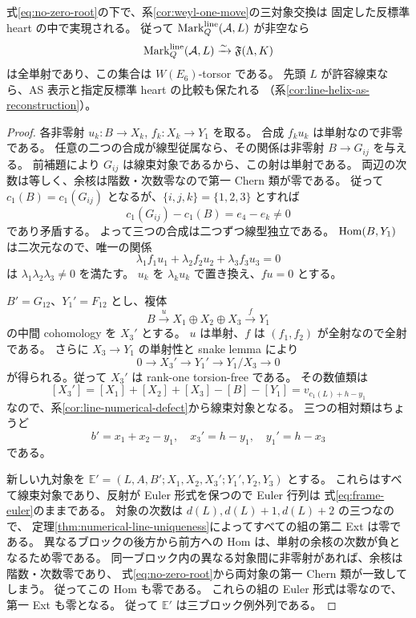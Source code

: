 \begin{theorem}[三対象反射の実現]\label{thm:rootfree-cross-reflection}
式\eqref{eq:no-zero-root}の下で、系\ref{cor:weyl-one-move}の三対象交換は
固定した反標準 heart の中で実現される。
従って $\operatorname{Mark}^{\rm line}_Q(\mathcal A,L)$ が非空なら
\[
 \operatorname{Mark}^{\rm line}_Q(\mathcal A,L)
 \xrightarrow{\sim}\mathfrak F(\Lambda,K)
\]
は全単射であり、この集合は $W(E_6)$-torsor である。
先頭 $L$ が許容線束なら、AS 表示と指定反標準 heart の比較も保たれる
（系\ref{cor:line-helix-as-reconstruction}）。
\end{theorem}
\begin{proof}
各非零射 $u_k:B\to X_k$, $f_k:X_k\to Y_1$ を取る。
合成 $f_ku_k$ は単射なので非零である。
任意の二つの合成が線型従属なら、その関係は非零射
$B\to G_{ij}$ を与える。
前補題により $G_{ij}$ は線束対象であるから、この射は単射である。
両辺の次数は等しく、余核は階数・次数零なので第一 Chern 類が零である。
従って $c_1(B)=c_1(G_{ij})$ となるが、$\{i,j,k\}=\{1,2,3\}$ とすれば
\[
 c_1(G_{ij})-c_1(B)=e_4-e_k\ne0
\]
であり矛盾する。
よって三つの合成は二つずつ線型独立である。
$\operatorname{Hom}(B,Y_1)$ は二次元なので、唯一の関係
\[
 \lambda_1f_1u_1+\lambda_2f_2u_2+\lambda_3f_3u_3=0
\]
は $\lambda_1\lambda_2\lambda_3\ne0$ を満たす。
$u_k$ を $\lambda_ku_k$ で置き換え、$fu=0$ とする。

$B'=G_{12}$、$Y_1'=F_{12}$ とし、複体
\[
 B\xrightarrow{u}X_1\oplus X_2\oplus X_3\xrightarrow{f}Y_1
\]
の中間 cohomology を $X_3'$ とする。
$u$ は単射、$f$ は $(f_1,f_2)$ が全射なので全射である。
さらに $X_3\to Y_1$ の単射性と snake lemma により
\[
 0\longrightarrow X_3'\longrightarrow Y_1'
 \longrightarrow Y_1/X_3\longrightarrow0
\]
が得られる。従って $X_3'$ は rank-one torsion-free である。
その数値類は
\[
 [X_3']=[X_1]+[X_2]+[X_3]-[B]-[Y_1]
 =v_{c_1(L)+h-y_1}
\]
なので、系\ref{cor:line-numerical-defect}から線束対象となる。
三つの相対類はちょうど
\[
 b'=x_1+x_2-y_1,\quad x_3'=h-y_1,\quad y_1'=h-x_3
\]
である。

新しい九対象を
$\mathbb E'=(L,A,B';X_1,X_2,X_3';Y_1',Y_2,Y_3)$ とする。
これらはすべて線束対象であり、反射が Euler 形式を保つので Euler 行列は
式\eqref{eq:frame-euler}のままである。
対象の次数は $d(L),d(L)+1,d(L)+2$ の三つなので、
定理\ref{thm:numerical-line-uniqueness}によってすべての組の第二 Ext は零である。
異なるブロックの後方から前方への Hom は、単射の余核の次数が負となるため零である。
同一ブロック内の異なる対象間に非零射があれば、余核は階数・次数零であり、
式\eqref{eq:no-zero-root}から両対象の第一 Chern 類が一致してしまう。
従ってこの Hom も零である。
これらの組の Euler 形式は零なので、第一 Ext も零となる。
従って $\mathbb E'$ は三ブロック例外列である。


\end{proof}
